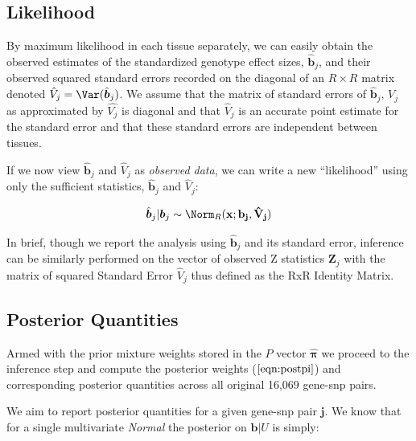 \begin{enumerate}

\subsection{Likelihood}

By maximum likelihood in each tissue separately, we can easily obtain the observed estimates of the standardized genotype effect sizes, $\hat{\bm{b}}_{j}$, and their observed squared standard errors recorded on the diagonal of an $R \times R$ matrix denoted $\hat{V}_{j} = \Var(\hat{\bm{b}}_{j})$. 
We assume that the matrix of standard errors of $\hat{\bm{b}}_{j}$, $V_{j}$ as approximated by $\hat{V_{j}}$ is diagonal and  that $\hat{V}_{j}$ is an accurate point estimate for the standard error and that these standard errors are independent between tissues.

If we now view $\hat{\bm{b}}_{j}$ and $\hat{V}_{j}$ as \emph{observed data}, we can write a new ``likelihood'' using only the sufficient statistics,   $\hat{\bm{b}}_{j}$ and $\hat{V}_{j}$:

\begin{equation}
\hat{\bm{b}}_{j} | \bm{b}_{j} \sim \Norm_R(\bf{x}; \bm{b}_{j}, \hat{V}_{j})
    \label{eqn:new_lik}
\end{equation}

In brief, though we report the analysis using $\hat{\bm{b}}_{j}$ and its standard error, inference can be similarly performed on the vector of observed Z statistics $\bm{Z}_{j}$ with the matrix of squared Standard Error $\hat{V}_{j}$ thus defined as the RxR Identity Matrix.

\subsection{Posterior Quantities}\label{sssec:posteriors}

Armed with the prior mixture weights stored in the $P$ vector $\hat{\bm{\pi}}$ we proceed to the inference step and compute the posterior weights ($\ref{eqn:postpi}$) and corresponding posterior quantities across all original 16,069 gene-snp pairs. %

We aim to report posterior quantities for a given gene-snp pair $\textbf{j}$. We know that for a single multivariate {\it Normal}  the posterior on  $\bm{b} | U$ is  simply: 


\end{enumerate}
